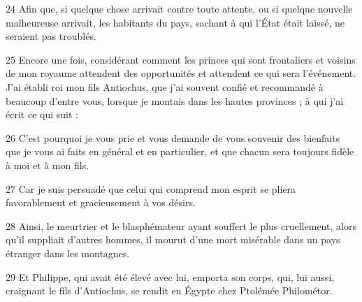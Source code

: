\par 24 Afin que, si quelque chose arrivait contre toute attente, ou si quelque nouvelle malheureuse arrivait, les habitants du pays, sachant à qui l'État était laissé, ne seraient pas troublés.
\par 25 Encore une fois, considérant comment les princes qui sont frontaliers et voisins de mon royaume attendent des opportunités et attendent ce qui sera l'événement. J'ai établi roi mon fils Antiochus, que j'ai souvent confié et recommandé à beaucoup d'entre vous, lorsque je montais dans les hautes provinces ; à qui j'ai écrit ce qui suit :
\par 26 C'est pourquoi je vous prie et vous demande de vous souvenir des bienfaits que je vous ai faits en général et en particulier, et que chacun sera toujours fidèle à moi et à mon fils.
\par 27 Car je suis persuadé que celui qui comprend mon esprit se pliera favorablement et gracieusement à vos désirs.
\par 28 Ainsi, le meurtrier et le blasphémateur ayant souffert le plus cruellement, alors qu'il suppliait d'autres hommes, il mourut d'une mort misérable dans un pays étranger dans les montagnes.
\par 29 Et Philippe, qui avait été élevé avec lui, emporta son corps, qui, lui aussi, craignant le fils d'Antiochus, se rendit en Égypte chez Ptolémée Philométor.


